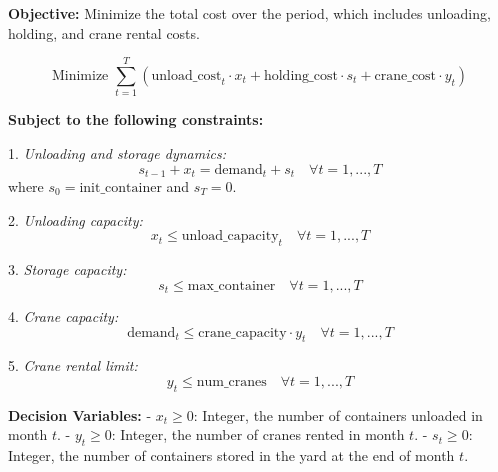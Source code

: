 \documentclass{article}
\begin{document}
\textbf{Objective:} Minimize the total cost over the period, which includes unloading, holding, and crane rental costs.

\[
\text{Minimize } \sum_{t=1}^{T} \left( \text{unload\_cost}_{t} \cdot x_{t} + \text{holding\_cost} \cdot s_{t} + \text{crane\_cost} \cdot y_{t} \right)
\]

\textbf{Subject to the following constraints:}

1. \textit{Unloading and storage dynamics:}
\[
s_{t-1} + x_{t} = \text{demand}_{t} + s_{t} \quad \forall t=1,...,T
\]
where \( s_{0} = \text{init\_container} \) and \( s_{T} = 0 \).

2. \textit{Unloading capacity:}
\[
x_{t} \leq \text{unload\_capacity}_{t} \quad \forall t=1,...,T
\]

3. \textit{Storage capacity:}
\[
s_{t} \leq \text{max\_container} \quad \forall t=1,...,T
\]

4. \textit{Crane capacity:}
\[
\text{demand}_{t} \leq \text{crane\_capacity} \cdot y_{t} \quad \forall t=1,...,T
\]

5. \textit{Crane rental limit:}
\[
y_{t} \leq \text{num\_cranes} \quad \forall t=1,...,T
\]

\textbf{Decision Variables:}
- \( x_{t} \geq 0 \): Integer, the number of containers unloaded in month \( t \).
- \( y_{t} \geq 0 \): Integer, the number of cranes rented in month \( t \).
- \( s_{t} \geq 0 \): Integer, the number of containers stored in the yard at the end of month \( t \).
\end{document}
